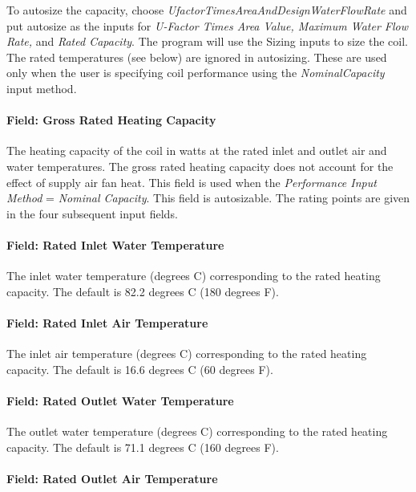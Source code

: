 To autosize the capacity, choose \emph{UfactorTimesAreaAndDesignWaterFlowRate} and put autosize as the inputs for \emph{U-Factor Times Area Value, Maximum Water Flow Rate,} and \emph{Rated Capacity}. The program will use the Sizing inputs to size the coil. The rated temperatures (see below) are ignored in autosizing. These are used only when the user is specifying coil performance using the \emph{NominalCapacity} input method.

\paragraph{Field: Gross Rated Heating Capacity}\label{field-gross-rated-heating-capacity}

The heating capacity of the coil in watts at the rated inlet and outlet air and water temperatures. The gross rated heating capacity does not account for the effect of supply air fan heat. This field is used when the \emph{Performance Input Method} = \emph{Nominal Capacity}. This field is autosizable. The rating points are given in the four subsequent input fields.

\paragraph{Field: Rated Inlet Water Temperature}\label{field-rated-inlet-water-temperature}

The inlet water temperature (degrees C) corresponding to the rated heating capacity. The default is 82.2 degrees C (180 degrees F).

\paragraph{Field: Rated Inlet Air Temperature}\label{field-rated-inlet-air-temperature}

The inlet air temperature (degrees C) corresponding to the rated heating capacity. The default is 16.6 degrees C (60 degrees F).

\paragraph{Field: Rated Outlet Water Temperature}\label{field-rated-outlet-water-temperature}

The outlet water temperature (degrees C) corresponding to the rated heating capacity. The default is 71.1 degrees C (160 degrees F).

\paragraph{Field: Rated Outlet Air Temperature}\label{field-rated-outlet-air-temperature}

